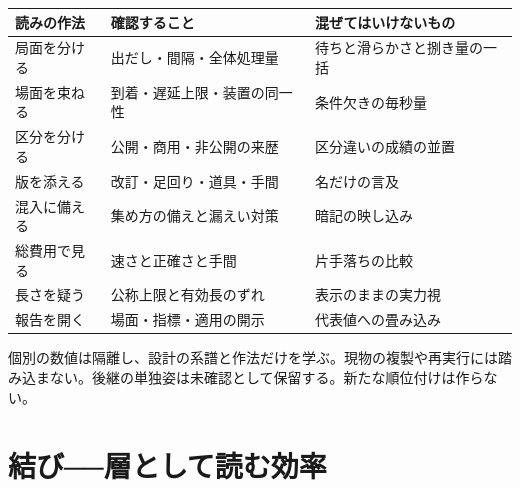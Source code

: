 \documentclass[lualatex,a4paper,10pt]{jlreq}
\begin{document}
\begin{center}
\small
\begin{tabularx}{\textwidth}{@{}p{}p{}X@{}}
\toprule
読みの作法 & 確認すること & 混ぜてはいけないもの \\
\midrule
局面を分ける & 出だし・間隔・全体処理量 & 待ちと滑らかさと捌き量の一括 \\
場面を束ねる & 到着・遅延上限・装置の同一性 & 条件欠きの毎秒量 \\
区分を分ける & 公開・商用・非公開の来歴 & 区分違いの成績の並置 \\
版を添える & 改訂・足回り・道具・手間 & 名だけの言及 \\
混入に備える & 集め方の備えと漏えい対策 & 暗記の映し込み \\
総費用で見る & 速さと正確さと手間 & 片手落ちの比較 \\
長さを疑う & 公称上限と有効長のずれ & 表示のままの実力視 \\
報告を開く & 場面・指標・適用の開示 & 代表値への畳み込み \\
\bottomrule
\end{tabularx}
\end{center}
\autocite{swebench,swepro,tbench,ruler,mlperf}

\begin{claimboundary}[本節の読解上の境界]
個別の数値は隔離し、設計の系譜と作法だけを学ぶ。現物の複製や再実行には踏み込まない。後継の単独姿は未確認として保留する。新たな順位付けは作らない。
\end{claimboundary}

\section{結び──層として読む効率}
\label{sec:synthesis}
\end{document}
